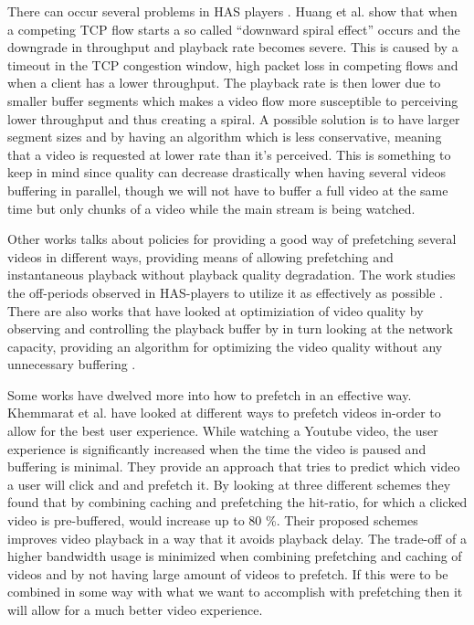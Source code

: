 There can occur several problems in HAS players \cite{qualbranch}. Huang et al. \cite{streamrate} show that when a competing TCP flow starts a so called “downward spiral effect” occurs and the downgrade in throughput and playback rate becomes severe. This is caused by a timeout in the TCP congestion window, high packet loss in competing flows and when a client has a lower throughput. The playback rate is then lower due to smaller buffer segments which makes a video flow more susceptible to perceiving lower throughput and thus creating a spiral. A possible solution is to have larger segment sizes and by having an algorithm which is less conservative, meaning that a video is requested at lower rate than it's perceived. This is something to keep in mind since quality can decrease drastically when having several videos buffering in parallel, though we will not have to buffer a full video at the same time but only chunks of a video while the main stream is being watched.

Other works talks about policies for providing a good way of prefetching several videos in different ways, providing means of allowing prefetching and instantaneous playback without playback quality degradation. The work studies the off-periods observed in HAS-players to utilize it as effectively as possible \cite{bandawarePrefetch}. There are also works that have looked at optimiziation of video quality by observing and controlling the playback buffer by in turn looking at the network capacity, providing an algorithm for optimizing the video quality without any unnecessary buffering \cite{bufferbased}.

Some works have dwelved more into how to prefetch in an effective way. Khemmarat et al. \cite{watchingprefetching} have looked at different ways to prefetch videos in-order to allow for the best user experience. While watching a Youtube video, the user experience is significantly increased when the time the video is paused and buffering is minimal. They provide an approach that tries to predict which video a user will click and and prefetch it. By looking at three different schemes they found that by combining caching and prefetching the hit-ratio, for which a clicked video is pre-buffered, would increase up to 80 \%. Their proposed schemes improves video playback in a way that it avoids playback delay. The trade-off of a higher bandwidth usage is minimized when combining prefetching and caching of videos and by not having large amount of videos to prefetch. If this were to be combined in some way with what we want to accomplish with prefetching then it will allow for a much better video experience.

